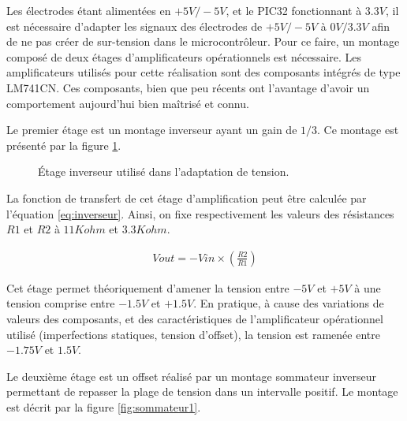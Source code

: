 \documentclass[letterpaper, twoside, 12pt, memoire, creativecommons, hyperref]{thETS}
\begin{document}
Les électrodes étant alimentées en $+5V/-5V$, et le PIC32 fonctionnant à $3.3V$, il est nécessaire d’adapter les signaux des électrodes de $+5V/-5V$ à $0V/3.3V$ afin de ne pas créer de sur-tension dans le microcontrôleur. Pour ce faire, un montage composé de deux étages d'amplificateurs opérationnels est nécessaire.  Les amplificateurs utilisés pour cette réalisation sont des composants intégrés de type LM741CN. Ces composants, bien que peu récents ont l'avantage d'avoir un comportement aujourd'hui bien maîtrisé et connu. 

Le premier étage est un montage inverseur ayant un gain de $1/3$. Ce montage est présenté par la figure \ref{fig:inverseur}.

\begin{figure}
	\centering
	\caption{Étage inverseur utilisé dans l'adaptation de tension.}
	\label{fig:inverseur}
\end{figure}

La fonction de transfert de cet étage d'amplification peut être calculée par l'équation \ref{eq:inverseur}. Ainsi, on fixe respectivement les valeurs des résistances $R1$ et $R2$ à $11Kohm$ et $3.3Kohm$.

\begin{align}\label{eq:inverseur}
   Vout = -Vin \times ( \frac{R2}{R1} )
\end{align}

Cet étage permet théoriquement d'amener la tension entre $-5V$ et $+5V$ à une tension comprise entre $-1.5V$ et $+1.5V$. En pratique, à cause des variations de valeurs des composants, et des caractéristiques de l'amplificateur opérationnel utilisé (imperfections statiques, tension d'offset), la tension est ramenée entre $-1.75V$ et $1.5V$.

Le deuxième étage est un offset réalisé par un montage sommateur inverseur permettant de repasser la plage de tension dans un intervalle positif. Le montage est décrit par la figure \ref{fig:sommateur1}. 
\end{document}
